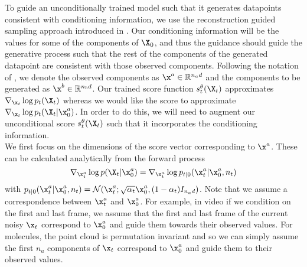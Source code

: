To guide an unconditionally trained model such that it generates datapoints consistent with conditioning information, we use the reconstruction guided sampling approach introduced in \cite{ho2022video}. Our conditioning information will be the values for some of the components of $\X_0$, and thus the guidance should guide the generative process such that the rest of the components of the generated datapoint are consistent with those observed components. Following the notation of \cite{ho2022video}, we denote the observed components as $\x^a \in \mathbb{R}^{n_a d}$ and the components to be generated as $\x^b \in \mathbb{R}^{n_b d}$. Our trained score function $s_t^\theta(\X_t)$ approximates $\nabla_{\x_t} \log p_t(\X_t)$ whereas we would like the score to approximate $\nabla_{\x_t} \log p_t(\X_t | \x_0^a)$. In order to do this, we will need to augment our unconditional score $s_t^\theta(\X_t)$ such that it incorporates the conditioning information.\\

We first focus on the dimensions of the score vector corresponding to $\x^a$. These can be calculated analytically from the forward process
\begin{equation}
    \nabla_{\x_t^a} \log p(\X_t | \x_0^a) = \nabla_{\x_t^a} \log p_{t|0}(\x_t^a | \x_0^a, n_t)
\end{equation}
with $p_{t|0}(\x_t^a | \x_0^a, n_t) = \mathcal{N}(\x_t^a; \sqrt{\alpha_t} \x_0^a, (1 - \alpha_t) I_{n_a d})$. Note that we assume a correspondence between $\x_t^a$ and $\x_0^a$. For example, in video if we condition on the first and last frame, we assume that the first and last frame of the current noisy $\x_t$ correspond to $\x_0^a$ and guide them towards their observed values. For molecules, the point cloud is permutation invariant and so we can simply assume the first $n_a$ components of $\x_t$ correspond to $\x_0^a$ and guide them to their observed values.\\

